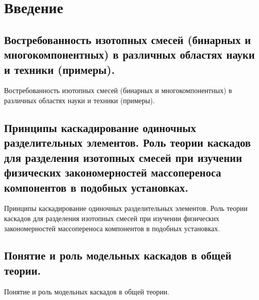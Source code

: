 \chapter*{Введение}                         %


\section{Востребованность изотопных смесей (бинарных и многокомпонентных) в различных областях науки и техники (примеры).}
Востребованность изотопных смесей (бинарных и многокомпонентных) в различных областях науки и техники (примеры).


\section{Принципы каскадирование одиночных разделительных элементов. Роль теории каскадов для разделения изотопных смесей при изучении физических закономерностей массопереноса компонентов в подобных установках.}

Принципы каскадирование одиночных разделительных элементов. Роль теории каскадов для разделения изотопных смесей при изучении физических закономерностей массопереноса компонентов в подобных установках.


\section{Понятие и роль модельных каскадов в общей теории.}

Понятие и роль модельных каскадов в общей теории.
